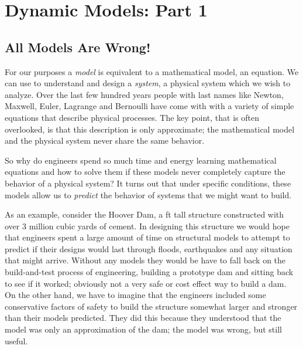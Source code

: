 \chapter{Dynamic Models: Part 1}\label{c:model1}
\renewcommand{\epigraphsize}{\small\itshape}
\renewcommand{\epigraphwidth}{4.25in}
\renewcommand{\epigraphrule}{0pt}
\begin{epigraphs}
\end{epigraphs}

\section{All Models Are Wrong!}
For our purposes a \emph{model} is equivalent to a \gls{mathematical model}, an equation.  We can use to understand and design a \emph{system}, a physical system which we wish to analyze.  Over the last few hundred years people with last names like Newton, Maxwell, Euler, Lagrange  and Bernoulli have come with with a variety of simple equations that describe physical processes.  The key point, that is often overlooked, is that this description is only approximate; the mathematical model and the physical system never share the same behavior.

So why do engineers spend so much time and energy learning mathematical equations and how to solve them if these models never completely capture the behavior of a physical system?  It turns out that under specific conditions, these models allow us to \emph{predict} the behavior of systems that we might want to build.  

As an example, consider the Hoover Dam, a \unit[726]{ft} tall structure constructed with over 3 million cubic yards of cement.  In designing this structure we would hope that engineers spent a large amount of time on structural models to attempt to predict if their designs would last through floods, earthquakes and any situation that might arrive.  Without any models they would be have to fall back on the build-and-test process of engineering, building a prototype dam and sitting back to see if it worked; obviously not a very safe or cost effect way to build a dam.  On the other hand, we have to imagine that the engineers included some conservative factors of safety to build the structure somewhat larger and stronger than their models predicted.  They did this because they understood that the model was only an approximation of the dam; the model was wrong, but still useful.  

